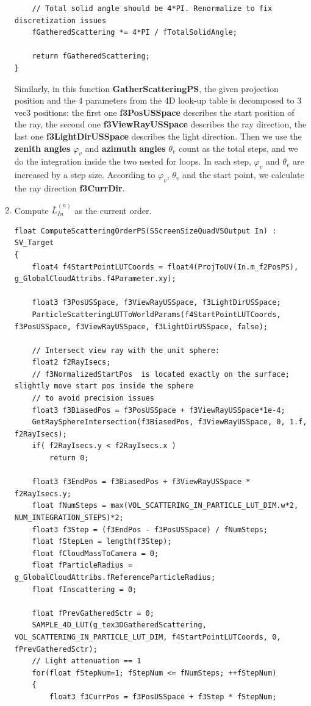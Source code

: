 \begin{enumerate}
\begin{lstlisting}
    // Total solid angle should be 4*PI. Renormalize to fix discretization issues
    fGatheredScattering *= 4*PI / fTotalSolidAngle;

    return fGatheredScattering;
}
\end{lstlisting}
Similarly, in this function \textbf{GatherScatteringPS}, the given projection position and the 4 parameters from the 4D look-up table is decomposed to 3 vec3 positions: the first one \textbf{f3PosUSSpace} describes the start position of the ray, the second one \textbf{f3ViewRayUSSpace} describes the ray direction, the last one \textbf{f3LightDirUSSpace} describes the light direction. Then we use the \textbf{zenith angles} $\varphi_v$ and \textbf{azimuth angles} $\theta_v$ count as the total steps, and we do the integration inside the two nested for loops. In each step, $\varphi_v$ and $\theta_v$ are increased by a step size. According to $\varphi_v$, $\theta_v$ and the start point, we calculate the ray direction \textbf{f3CurrDir}.


\item Compute $\bar{L}_{In}^{(n)}$ as the current order.
\begin{lstlisting}
float ComputeScatteringOrderPS(SScreenSizeQuadVSOutput In) : SV_Target
{
    float4 f4StartPointLUTCoords = float4(ProjToUV(In.m_f2PosPS), g_GlobalCloudAttribs.f4Parameter.xy);

    float3 f3PosUSSpace, f3ViewRayUSSpace, f3LightDirUSSpace;
    ParticleScatteringLUTToWorldParams(f4StartPointLUTCoords, f3PosUSSpace, f3ViewRayUSSpace, f3LightDirUSSpace, false);

    // Intersect view ray with the unit sphere:
    float2 f2RayIsecs;
    // f3NormalizedStartPos  is located exactly on the surface; slightly move start pos inside the sphere
    // to avoid precision issues
    float3 f3BiasedPos = f3PosUSSpace + f3ViewRayUSSpace*1e-4;
    GetRaySphereIntersection(f3BiasedPos, f3ViewRayUSSpace, 0, 1.f, f2RayIsecs);
    if( f2RayIsecs.y < f2RayIsecs.x )
        return 0;

    float3 f3EndPos = f3BiasedPos + f3ViewRayUSSpace * f2RayIsecs.y;
    float fNumSteps = max(VOL_SCATTERING_IN_PARTICLE_LUT_DIM.w*2, NUM_INTEGRATION_STEPS)*2;
    float3 f3Step = (f3EndPos - f3PosUSSpace) / fNumSteps;
    float fStepLen = length(f3Step);
    float fCloudMassToCamera = 0;
    float fParticleRadius = g_GlobalCloudAttribs.fReferenceParticleRadius;
    float fInscattering = 0;

    float fPrevGatheredSctr = 0;
    SAMPLE_4D_LUT(g_tex3DGatheredScattering, VOL_SCATTERING_IN_PARTICLE_LUT_DIM, f4StartPointLUTCoords, 0, fPrevGatheredSctr);
	// Light attenuation == 1
    for(float fStepNum=1; fStepNum <= fNumSteps; ++fStepNum)
    {
        float3 f3CurrPos = f3PosUSSpace + f3Step * fStepNum;


\end{lstlisting}
\end{enumerate}
